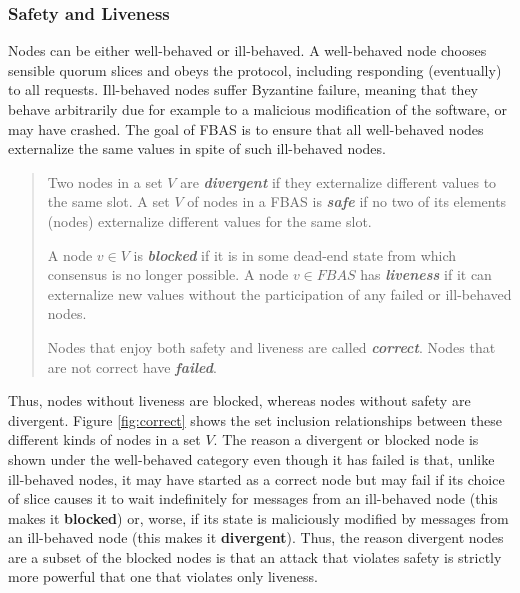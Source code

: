\subsubsection{Safety and Liveness\\}
Nodes can be either well-behaved or ill-behaved. A well-behaved node chooses sensible quorum slices and obeys the protocol, including responding (eventually) to all requests. Ill-behaved nodes suffer Byzantine failure, meaning that they behave arbitrarily due for example to a malicious modification of the software, or may have crashed. The goal of FBAS is to ensure that all well-behaved nodes externalize the same values in spite of such ill-behaved nodes.
\begin{quote}
\vspace{-0.6cm}
\small
\begin{defin}
Two nodes in a set $V$ are \emph{\textbf{divergent}} if they externalize different values to the same slot. A set $V$ of nodes in a FBAS is \emph{\textbf{safe}} if no two of its elements (nodes) externalize different values for the same slot.
\end{defin}
\begin{defin}
A node $v \in V$ is \emph{\textbf{blocked}} if it is in some dead-end state from which consensus is no longer possible. A node $v \in FBAS$ has \emph{\textbf{liveness}} if it can externalize new values without the participation of any failed or ill-behaved nodes.
\end{defin}
\begin{defin}
Nodes that enjoy both safety and liveness are called \emph{\textbf{correct}}. Nodes that are not correct have \emph{\textbf{failed}}.
\end{defin}
\end{quote}
Thus, nodes without liveness are blocked, whereas nodes without safety are divergent. Figure \ref{fig:correct} shows the set inclusion relationships between these different kinds of nodes in a set $V$. The reason a divergent or blocked node is shown under the well-behaved category even though it has failed is that, unlike ill-behaved nodes, it may have started as a correct node but may fail if its choice of slice causes it to wait indefinitely for messages from an ill-behaved node (this makes it {\bf blocked}) or, worse, if its state is maliciously modified by messages from an ill-behaved node (this makes it {\bf divergent}). Thus, the reason divergent nodes are a subset of the blocked nodes is that an attack that violates safety is strictly more powerful that one that violates only liveness.

